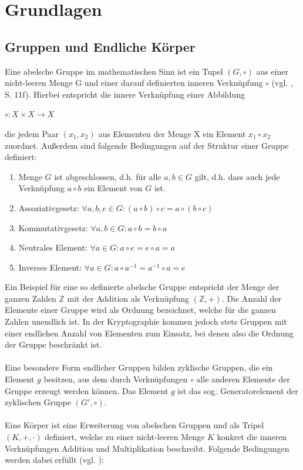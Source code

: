 
\chapter{Grundlagen} \label{sec:basics}

\section{Gruppen und Endliche Körper}

Eine abelsche Gruppe im mathematischen Sinn ist ein Tupel $(G,\circ)$ aus einer nicht-leeren Menge G und einer darauf definierten inneren Verknüpfung $\circ$ (vgl. \cite{puttmann}, S. 11f). Hierbei entspricht die innere Verknüpfung einer Abbildung 
\begin{center}
$ \circ: X \times X \to X $
\end{center}
die jedem Paar $(x_1,x_2)$ aus Elementen der Menge X ein Element $x_1 \circ x_2$ zuordnet. Außerdem sind folgende Bedingungen auf der Struktur einer Gruppe definiert: \\

\begin{enumerate}
  \item Menge $G$ ist abgeschlossen, d.h. für alle $a,b \in G$ gilt, d.h. dass auch jede Verknüpfung $a \circ b$ ein Element von $G$ ist. 
  \item Assoziativgesetz: $ \forall a,b,c \in G: (a \circ b) \circ c = a \circ (b \circ c) $
  \item Kommutativgesetz: $ \forall a,b \in G: a \circ b = b \circ a $
  \item Neutrales Element: $ \forall a \in G: a \circ e = e \circ a = a$
  \item Inverses Element: $ \forall a \in G: a \circ a^{-1} = a^{-1} \circ a = e$\\
\end{enumerate}

Ein Beispiel für eine so definierte abelsche Gruppe entspricht der Menge der ganzen Zahlen $\mathbb{Z}$ mit der Addition als Verknüpfung $(\mathbb{Z},+)$. Die Anzahl der Elemente einer Gruppe wird als Ordnung bezeichnet, welche für die ganzen Zahlen unendlich ist. In der Kryptographie kommen jedoch stets Gruppen mit einer endlichen Anzahl von Elementen zum Einsatz, bei denen also die Ordnung der Gruppe beschränkt ist. 
\\ \\
Eine besondere Form endlicher Gruppen bilden zyklische Gruppen, die ein Element $g$ besitzen, aus dem durch Verknüpfungen $\circ$ alle anderen Elemente der Gruppe erzeugt werden können. Das Element $g$ ist das sog. Generatorelement der zyklischen Gruppe $(G',\circ)$.
\\ \\
Eine Körper ist eine Erweiterung von abelschen Gruppen und als Tripel $(K,+,\cdot)$ definiert, welche zu einer nicht-leeren Menge $K$ konkret die inneren Verknüpfungen Addition und Multiplikation beschreibt. Folgende Bedingungen werden dabei erfüllt (vgl. \cite{puttmann}): \\


